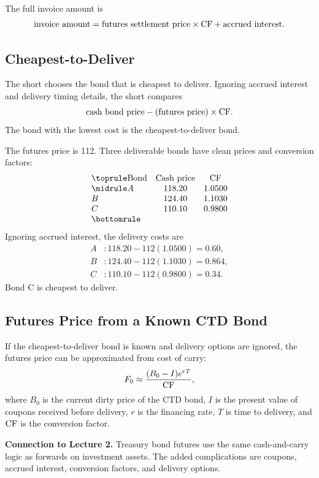 The full invoice amount is
\[
    \text{invoice amount}
    =
    \text{futures settlement price}\times \mathrm{CF}
    +\text{accrued interest}.
\]

\subsection{Cheapest-to-Deliver}

The short chooses the bond that is cheapest to deliver. Ignoring accrued
interest and delivery timing details, the short compares
\[
    \text{cash bond price}-(\text{futures price})\times \mathrm{CF}.
\]
The bond with the lowest cost is the cheapest-to-deliver bond.

\begin{exmp}
The futures price is 112. Three deliverable bonds have clean prices and
conversion factors:
\[
\begin{array}{lcc}
\toprule
\text{Bond} & \text{Cash price} & \CF \\
\midrule
A & 118.20 & 1.0500 \\
B & 124.40 & 1.1030 \\
C & 110.10 & 0.9800 \\
\bottomrule
\end{array}
\]
Ignoring accrued interest, the delivery costs are
\[
\begin{aligned}
A &: 118.20-112(1.0500)=0.60,\\
B &: 124.40-112(1.1030)=0.864,\\
C &: 110.10-112(0.9800)=0.34.
\end{aligned}
\]
Bond C is cheapest to deliver.
\end{exmp}

\subsection{Futures Price from a Known CTD Bond}

If the cheapest-to-deliver bond is known and delivery options are ignored, the
futures price can be approximated from cost of carry:
\[
    F_0 \approx \frac{(B_0-I)e^{rT}}{\mathrm{CF}},
\]
where $B_0$ is the current dirty price of the CTD bond, $I$ is the present value
of coupons received before delivery, $r$ is the financing rate, $T$ is time to
delivery, and $\mathrm{CF}$ is the conversion factor.

\begin{boxD}
\textbf{Connection to Lecture 2.} Treasury bond futures use the same
cash-and-carry logic as forwards on investment assets. The added complications
are coupons, accrued interest, conversion factors, and delivery options.
\end{boxD}

